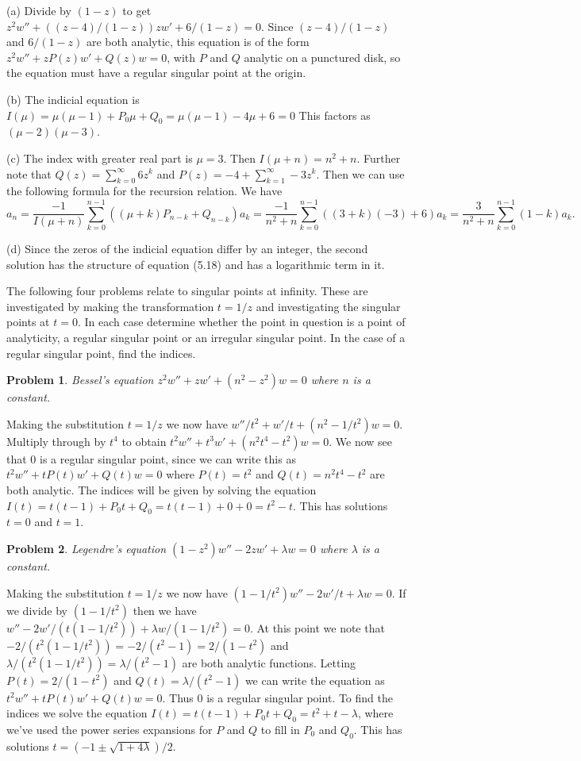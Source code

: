 \documentclass{article}
\newtheorem{problem}{Problem}
\begin{document}
(a) Divide by $(1-z)$ to get $z^2 w'' + ((z-4)/(1-z)) z w' + 6/(1-z) = 0$. Since $(z-4)/(1-z)$ and $6/(1-z)$ are both analytic, this equation is of the form $z^2 w'' + zP(z)w' + Q(z)w = 0$, with $P$ and $Q$ analytic on a punctured disk, so the equation must have a regular singular point at the origin.

(b) The indicial equation is $I(\mu) = \mu(\mu - 1) + P_0 \mu + Q_0 = \mu(\mu - 1) - 4 \mu + 6 = 0$ This factors as $(\mu - 2)(\mu - 3)$.

(c) The index with greater real part is $\mu = 3$. Then $I(\mu + n) = n^2 + n$. Further note that $Q(z) = \sum_{k=0}^{\infty} 6z^k$ and $P(z) = -4 + \sum_{k=1}^{\infty} -3z^k$. Then we can use the following formula for the recursion relation. We have
\[
a_n = \frac{-1}{I(\mu + n)} \sum_{k=0}^{n-1} ((\mu + k) P_{n-k} + Q_{n-k}) a_k = \frac{-1}{n^2 + n} \sum_{k=0}^{n-1} ((3 + k) (-3) + 6) a_k = \frac{3}{n^2 + n} \sum_{k=0}^{n-1}(1-k)a_k.
\]

(d) Since the zeros of the indicial equation differ by an integer, the second solution has the structure of equation (5.18) and has a logarithmic term in it.

The following four problems relate to singular points at infinity. These are investigated by making the transformation $t = 1/z$ and investigating the singular points at $t = 0$. In each case determine whether the point in question is a point of analyticity, a regular singular point or an irregular singular point. In the case of a regular singular point, find the indices.

\begin{problem}
Bessel's equation $z^2 w'' + z w' + (n^2 - z^2)w = 0$ where $n$ is a constant.
\end{problem}

Making the substitution $t = 1/z$ we now have $w''/t^2 + w'/t + (n^2 - 1/t^2) w = 0$. Multiply through by $t^4$ to obtain $t^2 w''+ t^3 w' + (n^2 t^4 - t^2) w = 0$. We now see that $0$ is a regular singular point, since we can write this as $t^2 w'' + tP(t)w' + Q(t)w = 0$ where $P(t) = t^2$ and $Q(t) = n^2t^4 - t^2$ are both analytic. The indices will be given by solving the equation $I(t) = t(t-1) + P_0t + Q_0 = t(t-1) + 0 + 0 = t^2 - t$. This has solutions $t = 0$ and $t = 1$.

\begin{problem}
Legendre's equation $(1-z^2) w'' - 2z w' + \lambda w = 0$ where $\lambda$ is a constant.
\end{problem}

Making the substitution $t = 1/z$ we now have $(1 - 1/t^2) w'' - 2w'/t + \lambda w = 0$. If we divide by $(1 - 1/t^2)$ then we have $w'' - 2w'/(t(1 - 1/t^2)) + \lambda w/(1 - 1/t^2) = 0$. At this point we note that $-2/(t^2(1 - 1/t^2)) = -2/(t^2 - 1) = 2/(1 - t^2)$ and $\lambda/(t^2(1 - 1/t^2)) = \lambda/(t^2 - 1)$ are both analytic functions. Letting $P(t) = 2/(1 - t^2)$ and $Q(t) = \lambda/(t^2 - 1)$ we can write the equation as $t^2 w'' + tP(t)w' + Q(t)w = 0$. Thus $0$ is a regular singular point. To find the indices we solve the equation $I(t) = t(t-1) + P_0t + Q_0 = t^2 + t - \lambda$, where we've used the power series expansions for $P$ and $Q$ to fill in $P_0$ and $Q_0$. This has solutions $t = (-1 \pm \sqrt{1 + 4 \lambda})/2$.
\end{document}

